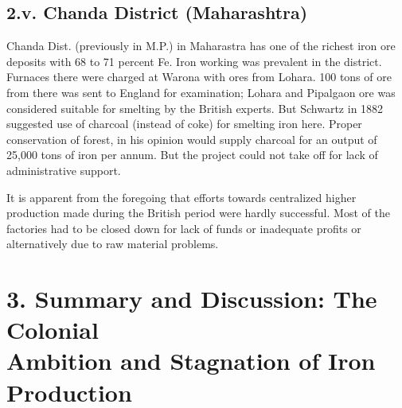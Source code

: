 
\subsection*{2.v. Chanda District (Maharashtra)}


Chanda Dist. (previously in M.P.) in Maharastra has one of the richest iron ore deposits with 68 to 71 percent Fe. Iron working was prevalent in the district. Furnaces there were charged at Warona with ores from Lohara.  100 tons of ore from there was sent to England for examination; Lohara and Pipalgaon ore was considered suitable for smelting by the British experts.  But Schwartz in 1882 suggested use of charcoal (instead of coke) for smelting iron here.  Proper conservation of forest, in his opinion would supply charcoal for an output of 25,000 tons of iron per annum.  But the project could not take off for lack of administrative support.

It is apparent from the foregoing that efforts towards centralized higher production made during the British period were hardly successful.  Most of the factories had to be closed down for lack of funds or inadequate profits or alternatively due to raw material problems.


\vspace{-.3cm}

\section*{3. Summary and Discussion: The Colonial\\ Ambition and Stagnation of Iron Production}\label{chapter6-section-3.a}

\vspace{-.2cm}

